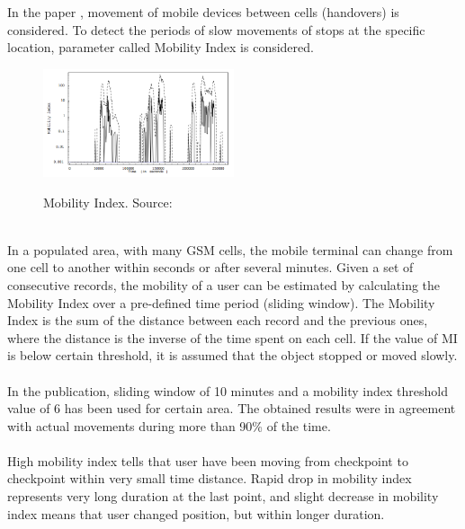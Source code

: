 In the paper \cite{MobilityIndexGIS}, movement of mobile devices between cells (handovers) is considered. To detect the periods of slow movements of stops at the specific location, parameter called Mobility Index is considered. 
\begin{figure}[!ht]
	\centering
	\includegraphics[width=0.5\textwidth]{images/intro_mobility_index.png}\\
	\caption{Mobility Index. Source: \cite{MobilityIndexGIS}}
	\label{fig:introduction_mob_index}
\end{figure}
\\
In a populated area, with many GSM cells, the mobile
terminal can change from one cell to another within
seconds or after several minutes. Given a set of consecutive records, the mobility of a user can be estimated by calculating the Mobility Index over a pre-defined time period (sliding window). The Mobility Index is the sum of the distance between each record and the previous ones, where the distance is the inverse of the time spent on each cell. If the value of MI is below certain threshold, it is assumed that the object stopped or moved slowly. 
\\\\
In the publication, sliding window of 10 minutes and a mobility index threshold value of 6 has been used for certain area. The obtained results were in agreement with actual movements during more than 90\% of the time. 
\\\\
High mobility index tells that user have been moving from checkpoint to checkpoint within very small time distance. Rapid drop in mobility index represents very long duration at the last point, and slight decrease in mobility index means that user changed position, but within longer duration.
